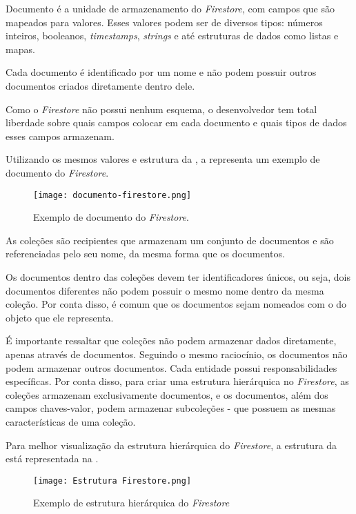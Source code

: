 Documento é a unidade de armazenamento do \textit{Firestore}, com campos que são mapeados para valores. Esses valores podem ser de diversos tipos: números inteiros, booleanos, \textit{timestamps}, \textit{strings} e até estruturas de dados como listas e mapas.

Cada documento é identificado por um nome e não podem possuir outros documentos criados diretamente dentro dele.

Como o \textit{Firestore} não possui nenhum esquema, o desenvolvedor tem total liberdade sobre quais campos colocar em cada documento e quais tipos de dados esses campos armazenam.

Utilizando os mesmos valores e estrutura da , a  representa um exemplo de documento do \textit{Firestore}.

\begin{figure}[!htb]
    \centering
    \texttt{[image: documento-firestore.png]}
    \caption{Exemplo de documento do \textit{Firestore}.}
    \label{fig:explicacaodocumentofirestore}
\end{figure}

As coleções são recipientes que armazenam um conjunto de documentos e são referenciadas pelo seu nome, da mesma forma que os documentos.

Os documentos dentro das coleções devem ter identificadores únicos, ou seja, dois documentos diferentes não podem possuir o mesmo nome dentro da mesma coleção. Por conta disso, é comum que os documentos sejam nomeados com o  do objeto que ele representa.

É importante ressaltar que coleções não podem armazenar dados diretamente, apenas através de documentos. Seguindo o mesmo raciocínio, os documentos não podem armazenar outros documentos. Cada entidade possui responsabilidades específicas. Por conta disso, para criar uma estrutura hierárquica no \textit{Firestore}, as coleções armazenam exclusivamente documentos, e os documentos, além dos campos chaves-valor, podem armazenar subcoleções - que possuem as mesmas características de uma coleção.

Para melhor visualização da estrutura hierárquica do \textit{Firestore}, a estrutura da  está representada na .

\begin{figure}[!htb]
    \centering
    \texttt{[image: Estrutura Firestore.png]}
    \caption{Exemplo de estrutura hierárquica do \textit{Firestore}}
    \label{fig:explicacaofirestorecompleto}
\end{figure}

